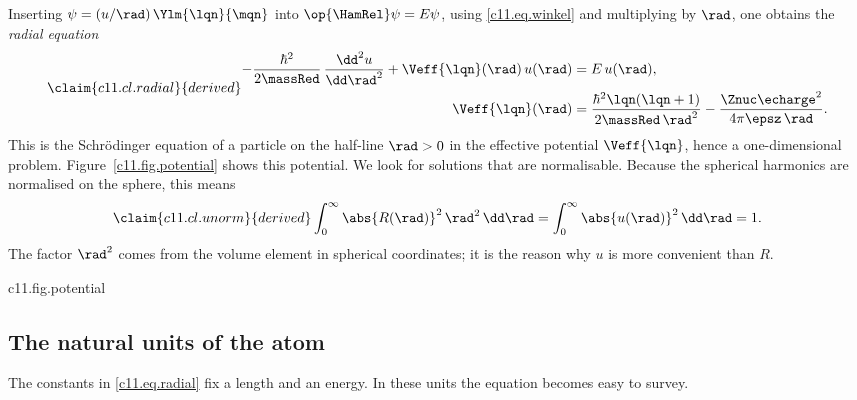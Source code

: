 Inserting $\psi = (u/\rad)\,\Ylm{\lqn}{\mqn}$ into $\op{\HamRel}\psi = E\psi$, using
\eqref{c11.eq.winkel} and multiplying by $\rad$, one obtains the \emph{radial equation}
\begin{equation}\label{c11.eq.radial}\claim{c11.cl.radial}{derived}
  \begin{aligned}
    -\frac{\hbar^2}{2\massRed}\,\frac{\dd^2 u}{\dd\rad^2} + \Veff{\lqn}(\rad)\,u(\rad)
    &= E\,u(\rad), \\
    \Veff{\lqn}(\rad) &= \frac{\hbar^2\lqn(\lqn + 1)}{2\massRed\,\rad^2}
      - \frac{\Znuc\echarge^2}{4\pi\epsz\,\rad}.
  \end{aligned}
\end{equation}
This is the Schrödinger equation of a particle on the half-line $\rad > 0$ in the
effective potential $\Veff{\lqn}$, hence a one-dimensional problem.
Figure~\ref{c11.fig.potential} shows this potential. We look for solutions that are
normalisable. Because
the spherical harmonics are normalised on the sphere, this means
\begin{equation}\label{c11.eq.unorm}\claim{c11.cl.unorm}{derived}
  \int_0^\infty \abs{R(\rad)}^2\,\rad^2\,\dd\rad = \int_0^\infty \abs{u(\rad)}^2\,\dd\rad = 1 .
\end{equation}
The factor $\rad^2$ comes from the volume element in spherical coordinates; it is the
reason why $u$ is more convenient than $R$.

\begin{tpcfigure}{c11.fig.potential}
  \caption{The effective potential $\Veff{\lqn}$ of \eqref{c11.eq.radial} for
    $\Znuc = 1$. Solid: $\lqn = 0$, the pure Coulomb potential. Dashed: $\lqn = 1$; the
    centrifugal term keeps the particle away from the origin and produces a well whose
    lowest point is marked. Thin horizontal lines: the energies $\En{1}$, $\En{2}$,
    $\En{3}$ of Theorem~\ref{c11.thm.spektrum}. Lengths in units of $\aRed$, energies in
    units of $\RydRed$; both contain the reduced mass.}
\end{tpcfigure}

\subsection{The natural units of the atom}\label{c11.s4.1}

The constants in \eqref{c11.eq.radial} fix a length and an energy. In these units the
equation becomes easy to survey.


